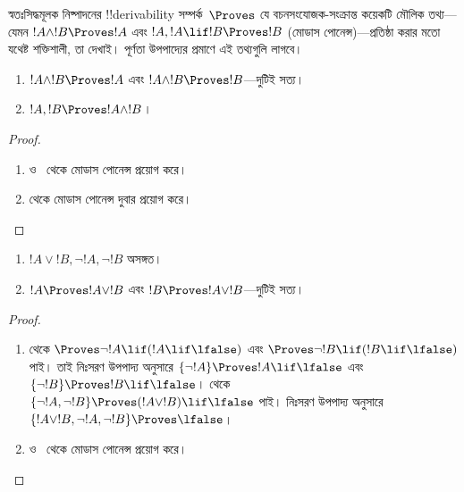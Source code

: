 \documentclass[../../../include/open-logic-section]{subfiles}
\begin{document}
      {}
      {}


\begin{explain}
  স্বতঃসিদ্ধমূলক নিষ্পাদনের !!{derivability} সম্পর্ক~$\Proves$ যে
  বচনসংযোজক-সংক্রান্ত কয়েকটি মৌলিক তথ্য—যেমন $!A \land !B \Proves
  !A$ এবং $!A, !A \lif !B \Proves !B$ (মোডাস পোনেন্স)—প্রতিষ্ঠা
  করার মতো যথেষ্ট শক্তিশালী, তা দেখাই। পূর্ণতা উপপাদ্যের প্রমাণে এই
  তথ্যগুলি লাগবে।
\end{explain}

\begin{prop}
  \begin{enumerate}
  \item {} $!A \land !B \Proves
    !A$ এবং $!A \land !B \Proves !B$—দুটিই সত্য।
  \item {} $!A, !B \Proves !A \land !B$।
  \end{enumerate}
\end{prop}

\begin{proof}
  \begin{enumerate}
    \item {} ও~ থেকে মোডাস
      পোনেন্স প্রয়োগ করে।
  \item {} থেকে মোডাস পোনেন্স দুবার প্রয়োগ করে।
  \end{enumerate}
\end{proof}


\begin{prop}
  \begin{enumerate}
  \item $!A \lor !B, \lnot !A, \lnot !B$ অসঙ্গত।
  \item $!A \Proves !A \lor !B$ এবং $!B \Proves !A \lor !B$—দুটিই সত্য।
  \end{enumerate}
\end{prop}

\begin{proof}
  \begin{enumerate}
  \item {} থেকে $\Proves \lnot !A \lif (!A
    \lif \lfalse)$ এবং $\Proves \lnot !B \lif (!B \lif \lfalse)$
    পাই। তাই নিঃসরণ উপপাদ্য অনুসারে $\{\lnot !A\} \Proves !A \lif
    \lfalse$ এবং $\{\lnot !B\} \Proves !B \lif \lfalse$।
     থেকে $\{\lnot !A, \lnot !B\} \Proves (!A
    \lor !B) \lif \lfalse$ পাই। নিঃসরণ উপপাদ্য অনুসারে $\{!A \lor
    !B, \lnot !A, \lnot !B\} \Proves \lfalse$।
  \item {} ও~ থেকে মোডাস
    পোনেন্স প্রয়োগ করে।
  \end{enumerate}
\end{proof}
\end{document}
